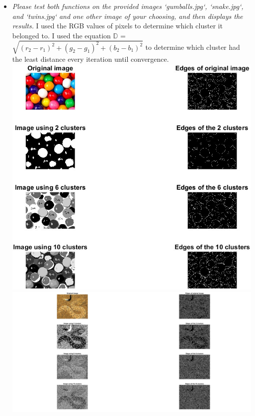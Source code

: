\documentclass[11pt]{article}
\begin{document}
\begin{itemize}
        \item \textit{Please test both functions on the provided images ‘gumballs.jpg‘, ‘snake.jpg‘, and ‘twins.jpg‘
        and one other image of your choosing, and then displays the results.}\newline
        I used the RGB values of pixels to determine which cluster it belonged to.\newline
        I used the equation $\mathbb{D}$ = $\sqrt {(r_2 - r_1)^2 + (g_2 - g_1)^2 + (b_2 - b_1)^2}$ to determine which
        cluster had the least distance every iteration until convergence.\newline
        \includegraphics[width=\textwidth]{Output Pictures/gumball_kmeans}\newline
        \includegraphics[width=\textwidth]{Output Pictures/snake_kmeans}\newline

\end{itemize}
\end{document}

